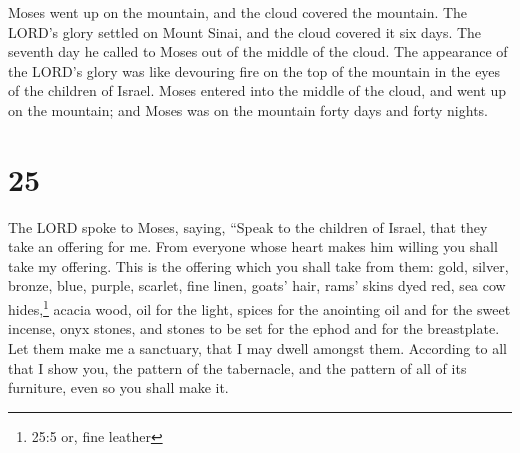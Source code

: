  Moses went up on the mountain, and the cloud covered the
mountain.  The LORD's glory settled on Mount Sinai, and the
cloud covered it six days. The seventh day he called to Moses out of the
middle of the cloud.  The appearance of the LORD's glory
was like devouring fire on the top of the mountain in the eyes of the
children of Israel.  Moses entered into the middle of the
cloud, and went up on the mountain; and Moses was on the mountain forty
days and forty nights.

\hypertarget{section-24}{%
\section{25}\label{section-24}}

 The LORD spoke to Moses, saying,  ``Speak to
the children of Israel, that they take an offering for me. From everyone
whose heart makes him willing you shall take my offering. 
This is the offering which you shall take from them: gold, silver,
bronze,  blue, purple, scarlet, fine linen, goats' hair,
 rams' skins dyed red, sea cow hides,\footnote{25:5 or, fine
  leather} acacia wood,  oil for the light, spices for the
anointing oil and for the sweet incense,  onyx stones, and
stones to be set for the ephod and for the breastplate.  Let
them make me a sanctuary, that I may dwell amongst them. 
According to all that I show you, the pattern of the tabernacle, and the
pattern of all of its furniture, even so you shall make it.

